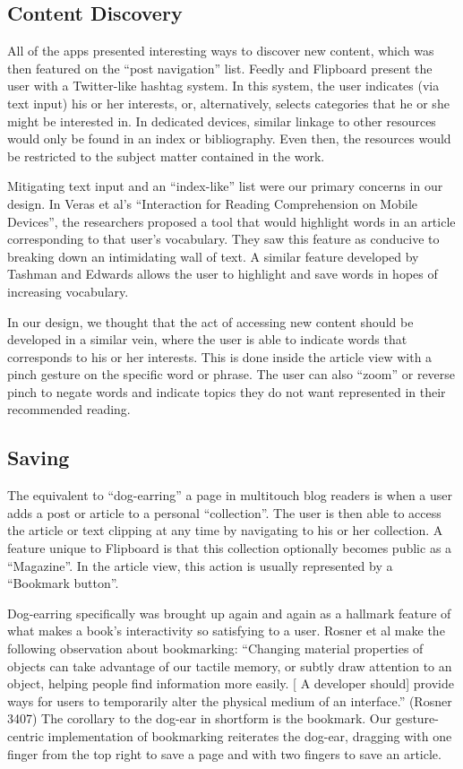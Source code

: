 \documentclass[11pt, oneside]{article}   	%
\begin{document}
\subsection{Content Discovery}
All of the apps presented interesting ways to discover new content, which was then featured on the ``post navigation'' list. Feedly and Flipboard present the user with a Twitter-like hashtag system. In this system, the user indicates (via text input) his or her interests, or, alternatively, selects categories that he or she might be interested in. In dedicated devices, similar linkage to other resources would only be found in an index or bibliography. Even then, the resources would be restricted to the subject matter contained in the work.

Mitigating text input and an ``index-like'' list were our primary concerns in our design. In Veras et al's ``Interaction for Reading Comprehension on Mobile Devices'', the researchers proposed a tool that would highlight words in an article corresponding to that user's vocabulary. They saw this feature as conducive to breaking down an intimidating wall of text. A similar feature developed by Tashman and Edwards allows the user to highlight and save words in hopes of increasing vocabulary.

In our design, we thought that the act of accessing new content  should be developed in a similar vein, where the user is able to indicate words that corresponds to his or her interests. This is done inside the article view with a pinch gesture on the specific word or phrase. The user can also ``zoom'' or reverse pinch to negate words and indicate topics they do not want represented in their recommended reading.

\subsection{Saving}
The equivalent to ``dog-earring'' a page in multitouch blog readers is when a user adds a post or article to a personal ``collection''. The user is then able to access the article or text clipping at any time by navigating to his or her collection. A feature unique to Flipboard is that this collection optionally becomes public as a ``Magazine''. In the article view, this action is usually represented by a ``Bookmark button''.

Dog-earring specifically was brought up again and again as a hallmark feature of what makes a book's interactivity so satisfying to a user. Rosner et al make the following observation about bookmarking: ``Changing material properties of objects can take advantage of our tactile memory, or subtly draw attention to an object, helping people find information more easily. [ A developer should] provide ways for users to temporarily alter the physical medium of an interface.'' (Rosner 3407) The corollary to the dog-ear in shortform is the bookmark. Our gesture-centric implementation of bookmarking reiterates the dog-ear, dragging with one finger from the top right to save a page and with two fingers to save an article.
\end{document}
